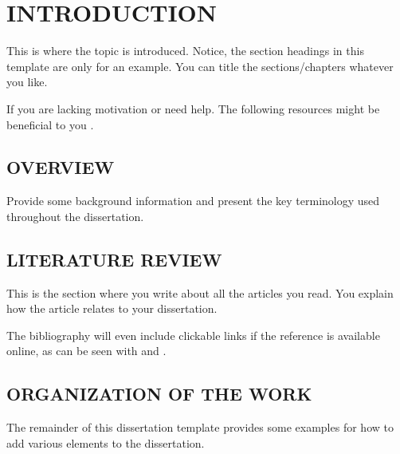 \documentclass[main.tex]{subfiles}
\begin{document}
\section{INTRODUCTION}

    This is where the topic is introduced.  Notice, the section headings in this template
    are only for an example.  You can title the sections/chapters whatever you like.
    
    If you are lacking motivation or need help.  The following resources might be 
    beneficial to you \cite{Bolker1998}.

\subsection{OVERVIEW}

    Provide some background information and present the key terminology used
    throughout the dissertation.

\subsection{LITERATURE REVIEW}
    
    This is the section where you write about all the articles you read.  You explain
    how the article relates to your dissertation. 
    
    The bibliography will even include clickable links if the reference
    is available online, as can be seen with
    \cite{Beck2001} and \cite{Andreessen2001}.
    

\subsection{ORGANIZATION OF THE WORK}

    The remainder of this dissertation template provides some examples
    for how to add various elements to the dissertation.
\end{document}
